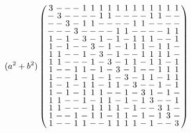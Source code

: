 \documentclass{beamer}
\begin{document}
\begin{frame}

  \[
    (a^2+b^2)
    \arraycolsep=1.0pt\def\arraystretch{0.75}
    \left(
      \begin{array}{cccccccccccccccc}
        3&-&-&-&1&1&1&1&1&1&1&1&1&1&1&1\\
        -&3&-&-&-&-&1&1&-&-&-&-&1&1&-&-\\
        -&-&3&-&1&1&-&-&-&-&1&1&-&-&-&-\\
        -&-&-&3&-&-&-&-&1&1&-&-&-&-&1&1\\
        1&-&1&-&3&-&1&-&1&-&1&1&1&-&-&1\\
        1&-&1&-&-&3&-&1&-&1&1&1&-&1&1&-\\
        1&1&-&-&1&-&3&-&1&-&-&1&1&1&1&-\\
        1&1&-&-&-&1&-&3&-&1&1&-&1&1&-&1\\
        1&-&-&1&1&-&1&-&3&-&1&-&-&1&1&1\\
        1&-&-&1&-&1&-&1&-&3&-&1&1&-&1&1\\
        1&-&1&-&1&1&-&1&1&-&3&-&-&1&-&1\\
        1&-&1&-&1&1&1&-&-&1&-&3&1&-&1&-\\
        1&1&-&-&1&-&1&1&-&1&-&1&3&-&-&1\\
        1&1&-&-&-&1&1&1&1&-&1&-&-&3&1&-\\
        1&-&-&1&-&1&1&-&1&1&-&1&-&1&3&-\\
        1&-&-&1&1&-&-&1&1&1&1&-&1&-&-&3\\
      \end{array}
    \right)
  \]
  
\end{frame}
\end{document}
